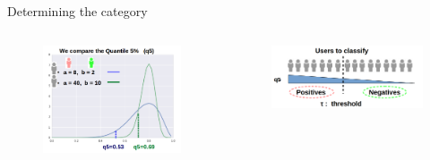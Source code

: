 \documentclass[usenames,dvipsnames]{beamer}
\begin{document}
\begin{frame}{Determining the category}

	\begin{columns}
		\begin{column}{0.49\textwidth}

\begin{figure}[h]
\begin{center}
\includegraphics[width=\columnwidth]{distribucion3.png}
\end{center}
\end{figure}
\end{column}

\begin{column}{0.49\textwidth}

\begin{figure}[h]
\begin{center}
\includegraphics[width=\columnwidth]{distribucion4.png}
\end{center}
\end{figure}


\end{column}
\end{columns}
\end{frame}
\end{document}
